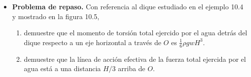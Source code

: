 \documentclass[11pt,a4paper]{article}
\begin{document}
\begin{itemize}
    \item[\textbf{40.}] \textbf{Problema de repaso.} Con referencia al dique estudiado en el ejemplo 10.4 y mostrado en la figura 10.5,
    \begin{enumerate}
        \item demuestre que el momento de torsión total ejercido por el agua detrás del dique respecto a un eje horizontal a través de \(O\) es \(\frac{1}{6} \rho g w H^3\).
        \item demuestre que la línea de acción efectiva de la fuerza total ejercida por el agua está a una distancia \(H/3\) arriba de \(O\).
    \end{enumerate}
    \vspace*{7cm}
\end{itemize}

\newpage
\end{document}
